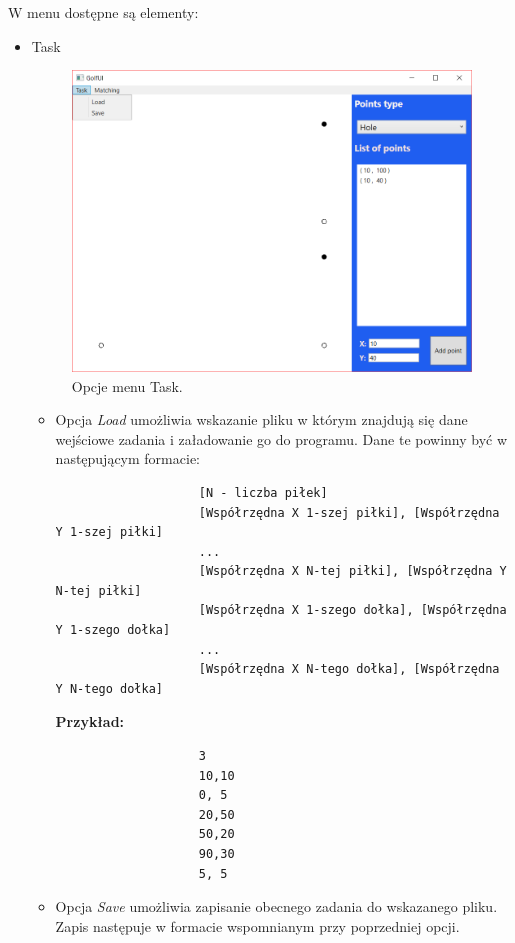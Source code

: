 \documentclass[10pt,a4paper]{article}
\begin{document}
	W menu dostępne są elementy:
	
	\begin{itemize}
		\item{Task}
		
			\begin{figure}[H]
				\centering	
 				\includegraphics[scale=0.6]{images/task.png}
 				\caption{Opcje menu Task.}
 				\label{fig:task_menu}
			\end{figure} 
			
			\begin{itemize}
				\item Opcja \textit{Load} umożliwia wskazanie pliku w którym znajdują się dane wejściowe zadania i załadowanie go do programu. Dane te powinny być w następującym formacie:
	
				\begin{verbatim}
					[N - liczba piłek]
					[Współrzędna X 1-szej piłki], [Współrzędna Y 1-szej piłki]
					...
					[Współrzędna X N-tej piłki], [Współrzędna Y N-tej piłki]
					[Współrzędna X 1-szego dołka], [Współrzędna Y 1-szego dołka]
					...
					[Współrzędna X N-tego dołka], [Współrzędna Y N-tego dołka]
				\end{verbatim}	
			
				\textbf{Przykład:} 		
				\begin{verbatim}
					3
					10,10
					0, 5
					20,50
					50,20
					90,30
					5, 5
				\end{verbatim}
		
				\item Opcja \textit{Save} umożliwia zapisanie obecnego zadania do wskazanego pliku. Zapis następuje w formacie wspomnianym przy poprzedniej opcji.
			\end{itemize}
		

\end{itemize}
\end{document}
